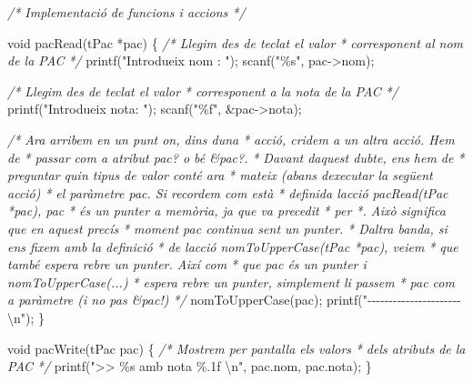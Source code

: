 \documentclass[
]{book}
\newenvironment{Shaded}{\begin{snugshade}}{\end{snugshade}}
\newcommand{\CommentTok}[1]{\textcolor[rgb]{0.56,0.35,0.01}{\textit{#1}}}
\newcommand{\DataTypeTok}[1]{\textcolor[rgb]{0.13,0.29,0.53}{#1}}
\newcommand{\NormalTok}[1]{#1}
\newcommand{\SpecialCharTok}[1]{\textcolor[rgb]{0.00,0.00,0.00}{#1}}
\newcommand{\StringTok}[1]{\textcolor[rgb]{0.31,0.60,0.02}{#1}}
\begin{document}
\begin{Shaded}
\begin{Highlighting}[]
\CommentTok{/* Implementació de funcions i accions */}

\DataTypeTok{void}\NormalTok{ pacRead(tPac *pac) \{}
    \CommentTok{/* Llegim des de teclat el valor}
\CommentTok{     * corresponent al nom de la PAC}
\CommentTok{     */}
\NormalTok{    printf(}\StringTok{"Introdueix nom : "}\NormalTok{);}
\NormalTok{    scanf(}\StringTok{"\%s"}\NormalTok{, pac{-}\textgreater{}nom);}

    \CommentTok{/* Llegim des de teclat el valor}
\CommentTok{     * corresponent a la nota de la PAC}
\CommentTok{     */}
\NormalTok{    printf(}\StringTok{"Introdueix nota: "}\NormalTok{);}
\NormalTok{    scanf(}\StringTok{"\%f"}\NormalTok{, \&pac{-}\textgreater{}nota);}
    
    \CommentTok{/* Ara arribem en un punt on, dins d\textquotesingle{}una}
\CommentTok{     * acció, cridem a un altra acció. Hem de }
\CommentTok{     * passar com a atribut pac? o bé \&pac?. }
\CommentTok{     * Davant d\textquotesingle{}aquest dubte, ens hem de }
\CommentTok{     * preguntar quin tipus de valor conté ara}
\CommentTok{     * mateix (abans d\textquotesingle{}executar la següent acció)}
\CommentTok{     * el paràmetre pac. Si recordem com està }
\CommentTok{     * definida l\textquotesingle{}acció pacRead(tPac *pac), pac}
\CommentTok{     * és un punter a memòria, ja que va precedit}
\CommentTok{     * per *. Això significa que en aquest precís}
\CommentTok{     * moment pac continua sent un punter.}
\CommentTok{     * D\textquotesingle{}altra banda, si ens fixem amb la definició}
\CommentTok{     * de l\textquotesingle{}acció nomToUpperCase(tPac *pac), veiem}
\CommentTok{     * que també espera rebre un punter. Així com }
\CommentTok{     * que pac és un punter i nomToUpperCase(...)}
\CommentTok{     * espera rebre un punter, simplement li passem}
\CommentTok{     * pac com a paràmetre (i no pas \&pac!)}
\CommentTok{     */}
\NormalTok{    nomToUpperCase(pac);}
\NormalTok{    printf(}\StringTok{"{-}{-}{-}{-}{-}{-}{-}{-}{-}{-}{-}{-}{-}{-}{-}{-}{-}{-}{-}{-}{-}{-}}\SpecialCharTok{\textbackslash{}n}\StringTok{"}\NormalTok{);}
\NormalTok{\}}

\DataTypeTok{void}\NormalTok{ pacWrite(tPac pac) \{}
    \CommentTok{/* Mostrem per pantalla els valors}
\CommentTok{     * dels atributs de la PAC}
\CommentTok{     */}
\NormalTok{    printf(}\StringTok{"\textgreater{}\textgreater{} \%s amb nota \%.1f }\SpecialCharTok{\textbackslash{}n}\StringTok{"}\NormalTok{, pac.nom, pac.nota);}
\NormalTok{\}}


\end{Highlighting}
\end{Shaded}
\end{document}
